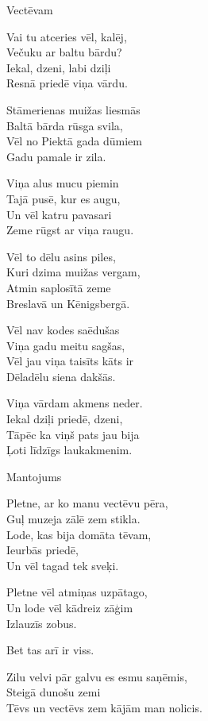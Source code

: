 \documentclass[14pt]{extarticle}
\begin{document}
\newpage

{\large \sc Vectēvam}

Vai tu atceries vēl, kalēj,\\
Večuku ar baltu bārdu?\\
Iekal, dzeni, labi dziļi\\
Resnā priedē viņa vārdu.

Stāmerienas muižas liesmās\\
Baltā bārda rūsga svila,\\
Vēl no Piektā gada dūmiem\\
Gadu pamale ir zila.

Viņa alus mucu piemin\\
Tajā pusē, kur es augu,\\
Un vēl katru pavasari\\
Zeme rūgst ar viņa raugu.

Vēl to dēlu asins piles,\\
Kuri dzima muižas vergam,\\
Atmin saplosītā zeme\\
Breslavā un Kēnigsbergā.

Vēl nav kodes saēdušas\\
Viņa gadu meitu sagšas,\\
Vēl jau viņa taisīts kāts ir\\
Dēladēlu siena dakšās.

Viņa vārdam akmens neder.\\
Iekal dziļi priedē, dzeni,\\
Tāpēc ka viņš pats jau bija\\
Ļoti līdzīgs laukakmenim.


\newpage

{\large \sc Mantojums}

Pletne, ar ko manu vectēvu pēra,\\
Guļ muzeja zālē zem stikla.\\
Lode, kas bija domāta tēvam,\\
Ieurbās priedē,\\
Un vēl tagad tek sveķi.

Pletne vēl atmiņas uzpātago,\\
Un lode vēl kādreiz zāģim\\
Izlauzīs zobus.

Bet tas arī ir viss.

Zilu velvi pār galvu es esmu saņēmis,\\
Steigā dunošu zemi\\
Tēvs un vectēvs zem kājām man nolicis.
\end{document}
